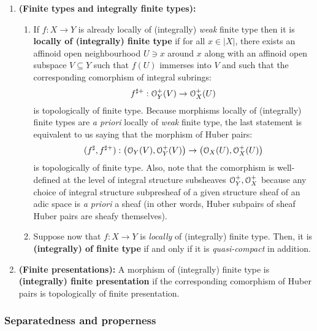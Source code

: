 \begin{definition}
\begin{enumerate}
                            \item \textbf{(Finite types and integrally finite types):} 
                                \begin{enumerate}
                                    \item If $f: X \to Y$ is already locally of (integrally) \textit{weak} finite type then it is \textbf{locally of (integrally) finite type} if for all $x \in |X|$, there exists an affinoid open neighbourhood $U \ni x$ around $x$ along with an affinoid open subspace $V \subseteq Y$ such that $f(U)$ immerses into $V$ and such that the corresponding comorphism of integral subrings:
                                        $$f^{\sharp +}: \mathcal{O}_Y^+(V) \to \mathcal{O}_X^+(U)$$
                                    is topologically of finite type. Because morphisms locally of (integrally) finite types are \textit{a priori} locally of \textit{weak} finite type, the last statement is equivalent to us saying that the morphism of Huber pairs:
                                        $$(f^{\sharp}, f^{\sharp +}): \left(\mathcal{O}_Y(V), \mathcal{O}_Y^+(V)\right) \to \left(\mathcal{O}_X(U), \mathcal{O}_X^+(U)\right)$$
                                    is topologically of finite type. Also, note that the comorphism is well-defined at the level of integral structure subsheaves $\mathcal{O}_Y^+, \mathcal{O}_X^+$ because any choice of integral structure subpresheaf of a given structure sheaf of an adic space is \textit{a priori} a sheaf (in other words, Huber subpairs of sheaf Huber pairs are sheafy themselves). 
                                    \item Suppose now that $f: X \to Y$ is \textit{locally} of (integrally) finite type. Then, it is \textbf{(integrally) of finite type} if and only if it is \textit{quasi-compact} in addition.
                                \end{enumerate}
                            \item \textbf{(Finite presentations):} A morphism of (integrally) finite type is \textbf{(integrally) finite presentation} if the corresponding comorphism of Huber pairs is topologically of finite presentation.
                        \end{enumerate}
                \end{definition}
            
            \subsubsection{Separatedness and properness}
            
